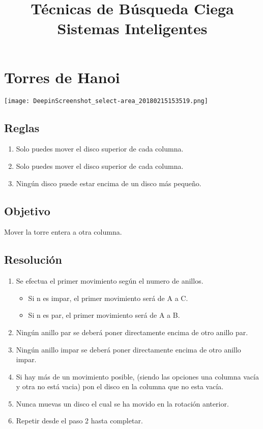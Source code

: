 \documentclass[a4paper,10pt]{article}
\title{Técnicas de Búsqueda Ciega\\Sistemas Inteligentes}
\begin{document}
\maketitle
\pagebreak
\section{Torres de Hanoi}
\graphicspath{{/home/diego/Desktop/}}
\centering
\texttt{[image: DeepinScreenshot\_select-area\_20180215153519.png]}
\raggedright
\subsection{Reglas}
\begin{enumerate}
	\item Solo puedes mover el disco superior de cada columna.
	\item Solo puedes mover el disco superior de cada columna.
	\item Ningún disco puede estar encima de un disco más pequeño.
\end{enumerate}
\subsection{Objetivo}
Mover la torre entera a otra columna.
\subsection{Resolución}
\begin{enumerate}
	\item Se efectua el primer movimiento según el numero de anillos.
	\begin{itemize}
		\item Si n es impar, el primer movimiento será de A a C.
		\item Si n es par, el primer movimiento será de A a B.
	\end{itemize}
	\item Ningún anillo par se deberá poner directamente encima de otro anillo par.
	\item Ningún anillo impar se deberá poner directamente encima de otro anillo impar.
	\item Si hay más de un movimiento posible, (siendo las opciones una columna vacía y otra no está vacia) pon el disco en la columna que no esta vacía.
	\item Nunca muevas un disco el cual se ha movido en la rotación anterior.
	\item Repetir desde el paso 2 hasta completar.
\end{enumerate}
\pagebreak
\end{document}
